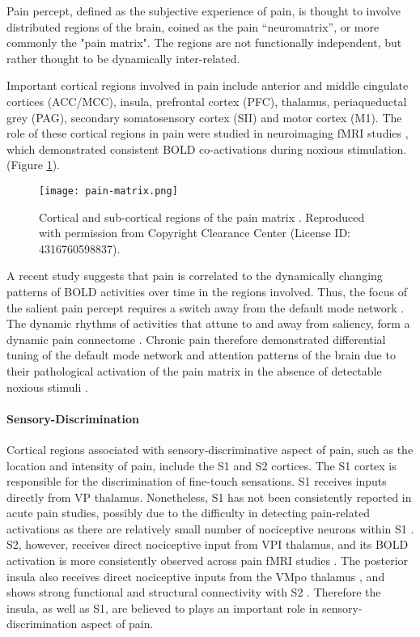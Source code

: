 Pain percept, defined as the subjective experience of pain, is thought to involve distributed regions of the brain, coined as the pain “neuromatrix”\cite{Melzack1999a}, or more commonly the "pain matrix". The regions are not functionally independent, but rather thought to be dynamically inter-related. 

 Important cortical regions involved in pain include anterior and middle cingulate cortices (ACC/MCC), insula, prefrontal cortex (PFC), thalamus, periaqueductal grey (PAG), secondary somatosensory cortex (SII) and motor cortex (M1). The role of these cortical regions in pain were studied in neuroimaging fMRI studies \cite{Apkarian2013c,Wager2013,Davis2012a}, which demonstrated consistent BOLD co-activations during noxious stimulation. (Figure \ref{fig:pain-matrix}).

 \begin{figure}[ht]
 \texttt{[image: pain-matrix.png]}
 \centering
 \caption{ Cortical and sub-cortical regions of the pain matrix \protect\cite{Tracey2007a}. Reproduced with permission from Copyright Clearance Center (License ID: 4316760598837).}
 \label{fig:pain-matrix}
 \end{figure}
 
A recent study suggests that pain is correlated to the dynamically changing patterns of BOLD activities over time in the regions involved. Thus, the focus of the salient pain percept requires a switch away from the default mode network \cite{Kucyi2013}. The dynamic rhythms of activities that attune to and away from saliency, form a dynamic pain connectome \cite{Kucyi2015}. Chronic pain therefore demonstrated differential tuning of the default mode network and attention patterns of the brain due to their pathological activation of the pain matrix in the absence of detectable noxious stimuli \cite{Baliki2008,Legrain2009}.

\paragraph{Sensory-Discrimination}
Cortical regions associated with sensory-discriminative aspect of pain, such as the location and intensity of pain, include the S1 and S2 cortices. The S1 cortex is responsible for the discrimination of fine-touch sensations. S1 receives inputs directly from VP thalamus. Nonetheless, S1 has not been consistently reported in acute pain studies, possibly due to the difficulty in detecting pain-related activations as there are relatively small number of nociceptive neurons within S1 \cite{bushnell1999pain}. S2, however, receives direct nociceptive input from VPI thalamus, and its BOLD activation is more consistently observed across pain fMRI studies \cite{Wager2013,Brodersen2012}. The posterior insula also receives direct nociceptive inputs from the VMpo thalamus \cite{Craig2003}, and shows strong functional and structural connectivity with S2 \cite{Wiech2014}. Therefore the insula, as well as S1, are believed to plays an important role in sensory-discrimination aspect of pain. 

